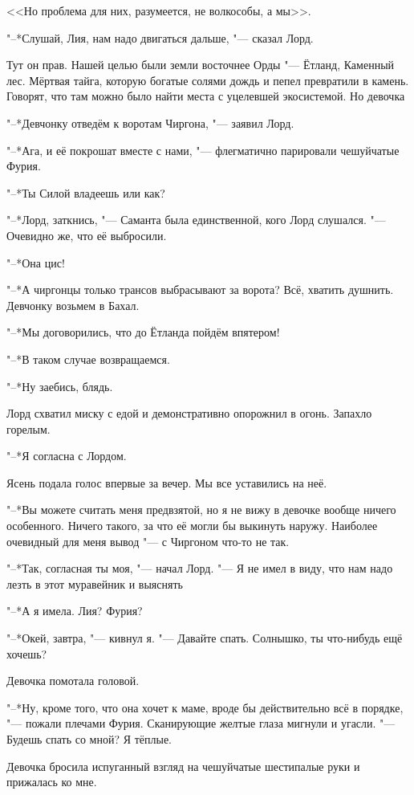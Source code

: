 \documentclass[a4paper,10pt,fleqn]{book}
\newcommand{\ldotst}{\so{...}\xspace}
\begin{document}
<<Но проблема для них, разумеется, не волкособы, а мы>>.

"--*Слушай, Лия, нам надо двигаться дальше, "--- сказал Лорд.

Тут он прав.
Нашей целью были земли восточнее Орды "--- Ётланд, Каменный лес.
Мёртвая тайга, которую богатые солями дождь и пепел превратили в камень.
Говорят, что там можно было найти места с уцелевшей экосистемой.
Но девочка\ldotst

"--*Девчонку отведём к воротам Чиргона, "--- заявил Лорд.

"--*Ага, и её покрошат вместе с нами, "--- флегматично парировали чешуйчатые Фурия.

"--*Ты Силой владеешь или как?

"--*Лорд, заткнись, "--- Саманта была единственной, кого Лорд слушался.
"--- Очевидно же, что её выбросили.

"--*Она цис!

"--*А чиргонцы только трансов выбрасывают за ворота?
Всё, хватить душнить.
Девчонку возьмем в Бахал.

"--*Мы договорились, что до Ётланда пойдём впятером!

"--*В таком случае возвращаемся.

"--*Ну заебись, блядь.

Лорд схватил миску с едой и демонстративно опорожнил в огонь.
Запахло горелым.

"--*Я согласна с Лордом.

Ясень подала голос впервые за вечер.
Мы все уставились на неё.

"--*Вы можете считать меня предвзятой, но я не вижу в девочке вообще ничего особенного.
Ничего такого, за что её могли бы выкинуть наружу.
Наиболее очевидный для меня вывод "--- с Чиргоном что-то не так.

"--*Так, согласная ты моя, "--- начал Лорд.
"--- Я не имел в виду, что нам надо лезть в этот муравейник и выяснять\ldotst

"--*А я имела.
Лия?
Фурия?

"--*Окей, завтра, "--- кивнул я.
"--- Давайте спать.
Солнышко, ты что-нибудь ещё хочешь?

Девочка помотала головой.

"--*Ну, кроме того, что она хочет к маме, вроде бы действительно всё в порядке, "--- пожали плечами Фурия.
Сканирующие желтые глаза мигнули и угасли.
"--- Будешь спать со мной?
Я тёплые.

Девочка бросила испуганный взгляд на чешуйчатые шестипалые руки и прижалась ко мне.
\end{document}
